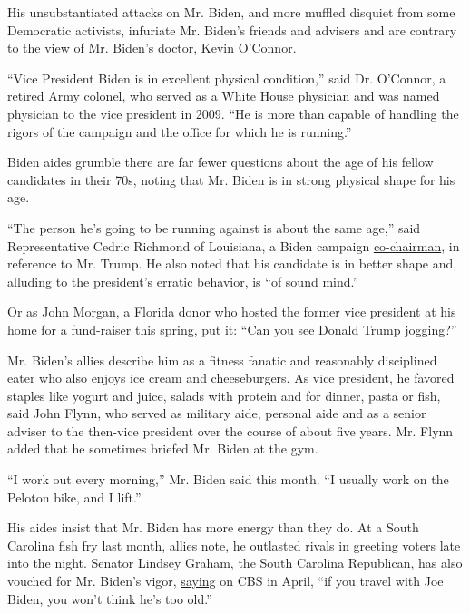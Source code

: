 His unsubstantiated attacks on Mr. Biden, and more muffled disquiet from
some Democratic activists, infuriate Mr. Biden's friends and advisers
and are contrary to the view of Mr. Biden's doctor,
\href{https://www.gwdocs.com/find-a-doctor/kevin-oconnor-do/}{Kevin
O'Connor}.

``Vice President Biden is in excellent physical condition,'' said Dr.
O'Connor, a retired Army colonel, who served as a White House physician
and was named physician to the vice president in 2009. ``He is more than
capable of handling the rigors of the campaign and the office for which
he is running.''

Biden aides grumble there are far fewer questions about the age of his
fellow candidates in their 70s, noting that Mr. Biden is in strong
physical shape for his age.

``The person he's going to be running against is about the same age,''
said Representative Cedric Richmond of Louisiana, a Biden campaign
\href{https://www.nytimes3xbfgragh.onion/2019/05/31/us/politics/biden-cochair-cedric-richmond.html}{co-chairman},
in reference to Mr. Trump. He also noted that his candidate is in better
shape and, alluding to the president's erratic behavior, is ``of sound
mind.''

Or as John Morgan, a Florida donor who hosted the former vice president
at his home for a fund-raiser this spring, put it: ``Can you see Donald
Trump jogging?''

Mr. Biden's allies describe him as a fitness fanatic and reasonably
disciplined eater who also enjoys ice cream and cheeseburgers. As vice
president, he favored staples like yogurt and juice, salads with protein
and for dinner, pasta or fish, said John Flynn, who served as military
aide, personal aide and as a senior adviser to the then-vice president
over the course of about five years. Mr. Flynn added that he sometimes
briefed Mr. Biden at the gym.

``I work out every morning,'' Mr. Biden said this month. ``I usually
work on the Peloton bike, and I lift.''

His aides insist that Mr. Biden has more energy than they do. At a South
Carolina fish fry last month, allies note, he outlasted rivals in
greeting voters late into the night. Senator Lindsey Graham, the South
Carolina Republican, has also vouched for Mr. Biden's vigor,
\href{https://www.apnews.com/a9256c8194da4fc79424e9b41c1d6459}{saying}
on CBS in April, ``if you travel with Joe Biden, you won't think he's
too old.''

